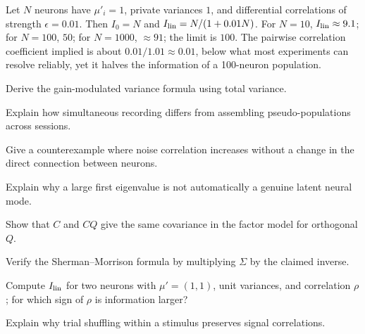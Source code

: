 \begin{workedexample}
Let $N$ neurons have $\mu'_i=1$, private variances $1$, and differential correlations of strength $\epsilon=0.01$. Then $I_0=N$ and $I_{\rm lin}=N/(1+0.01N)$. For $N=10$, $I_{\rm lin}\approx9.1$; for $N=100$, $50$; for $N=1000$, $\approx91$; the limit is $100$. The pairwise correlation coefficient implied is about $0.01/1.01\approx0.01$, below what most experiments can resolve reliably, yet it halves the information of a 100-neuron population.
\end{workedexample}
\begin{exercises}
\item Derive the gain-modulated variance formula using total variance.
\item Explain how simultaneous recording differs from assembling pseudo-populations across sessions.
\item Give a counterexample where noise correlation increases without a change in the direct connection between neurons.
\item Explain why a large first eigenvalue is not automatically a genuine latent neural mode.
\item Show that $C$ and $CQ$ give the same covariance in the factor model for orthogonal $Q$.
\item Verify the Sherman--Morrison formula by multiplying $\Sigma$ by the claimed inverse.
\item Compute $I_{\rm lin}$ for two neurons with $\mu'=(1,1)$, unit variances, and correlation $\rho$; for which sign of $\rho$ is information larger?
\item Explain why trial shuffling within a stimulus preserves signal correlations.
\end{exercises}
